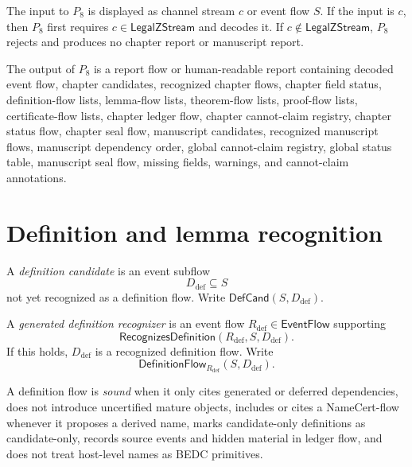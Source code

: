 \begin{definition}[$P_8$ input]
\label{def:chapter-manuscript-p8-input}
The input to $P_8$ is displayed as channel stream $c$ or event flow $S$. If the input is $c$, then $P_8$ first requires $c\in\mathsf{LegalZStream}$ and decodes it. If $c\notin\mathsf{LegalZStream}$, $P_8$ rejects and produces no chapter report or manuscript report.
\end{definition}

\begin{definition}[$P_8$ output]
\label{def:chapter-manuscript-p8-output}
The output of $P_8$ is a report flow or human-readable report containing decoded event flow, chapter candidates, recognized chapter flows, chapter field status, definition-flow lists, lemma-flow lists, theorem-flow lists, proof-flow lists, certificate-flow lists, chapter ledger flow, chapter cannot-claim registry, chapter status flow, chapter seal flow, manuscript candidates, recognized manuscript flows, manuscript dependency order, global cannot-claim registry, global status table, manuscript seal flow, missing fields, warnings, and cannot-claim annotations.
\end{definition}

\section{Definition and lemma recognition}
\label{sec:chapter-manuscript-definitions-lemmas}

\begin{definition}
\label{def:chapter-manuscript-definition-candidate-recognizer}
A \emph{definition candidate} is an event subflow
$$
  D_{\mathrm{def}}\subseteq S
$$
not yet recognized as a definition flow. Write $\mathsf{DefCand}(S,D_{\mathrm{def}})$.

A \emph{generated definition recognizer} is an event flow $R_{\mathrm{def}}\in\mathsf{EventFlow}$ supporting
$$
  \mathsf{RecognizesDefinition}(R_{\mathrm{def}},S,D_{\mathrm{def}}).
$$
If this holds, $D_{\mathrm{def}}$ is a recognized definition flow. Write
$$
  \mathsf{DefinitionFlow}_{R_{\mathrm{def}}}(S,D_{\mathrm{def}}).
$$
\end{definition}

\begin{definition}
\label{def:chapter-manuscript-definition-soundness}
A definition flow is \emph{sound} when it only cites generated or deferred dependencies, does not introduce uncertified mature objects, includes or cites a NameCert-flow whenever it proposes a derived name, marks candidate-only definitions as candidate-only, records source events and hidden material in ledger flow, and does not treat host-level names as BEDC primitives.
\end{definition}

